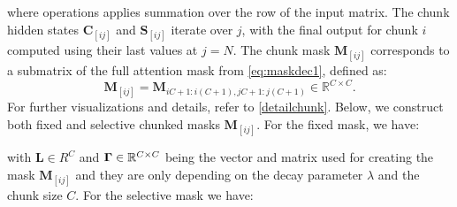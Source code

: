 where  operations applies summation over the row of the input matrix. The chunk hidden states \(\mathbf{C}_{[ij]}\) and \(\mathbf{S}_{[ij]}\) iterate over \(j\), with the final output for chunk \(i\) computed using their last values at \(j = N\). The chunk mask \(\mathbf{M}_{[ij]}\) corresponds to a submatrix of the full attention mask from \cref{eq:maskdec1}, defined as:
\[
\mathbf{M}_{[ij]} = \mathbf{M}_{iC+1:i(C+1),jC+1:j(C+1)} \in \mathbb{R}^{C \times C}.
\]
For further visualizations and details, refer to \cref{detailchunk}. Below, we construct both fixed and selective chunked masks $\mathbf{M}_{[ij]}$. For the fixed mask, we have:  

with $\mathbf{L} \in R^C$ and $\mathbf{\Gamma} \in \mathbb{R}^{C\times C}$ being the vector and matrix used for creating the mask $\mathbf{M}_{[ij]}$ and they are only depending on the decay parameter $\lambda$ and the chunk size $C$. For the selective mask we have:

